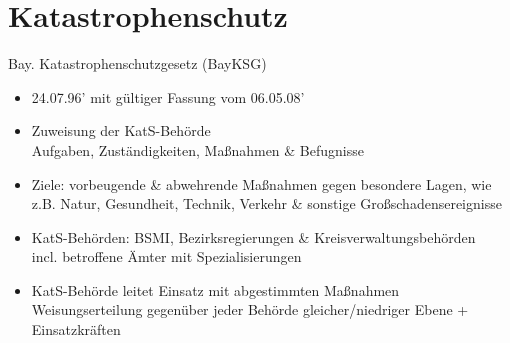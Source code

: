 \section{Katastrophenschutz}
\begin{sectionbox}{Bay. Katastrophenschutzgesetz (BayKSG)}
    \begin{itemize}
        \item 24.07.96' mit gültiger Fassung vom 06.05.08'
        \item Zuweisung der KatS-Behörde\\
        \ra Aufgaben, Zuständigkeiten, Maßnahmen \& Befugnisse
        \item Ziele: vorbeugende \& abwehrende Maßnahmen gegen besondere Lagen, wie z.B. Natur, Gesundheit, Technik, Verkehr \& sonstige Großschadensereignisse
        \item KatS-Behörden: BSMI, Bezirksregierungen \& Kreisverwaltungsbehörden\\
        \ra incl. betroffene Ämter mit Spezialisierungen
        \item KatS-Behörde leitet Einsatz mit abgestimmten Maßnahmen\\
        \ra Weisungserteilung gegenüber jeder Behörde gleicher/niedriger Ebene + Einsatzkräften
    \end{itemize}
\end{sectionbox}

